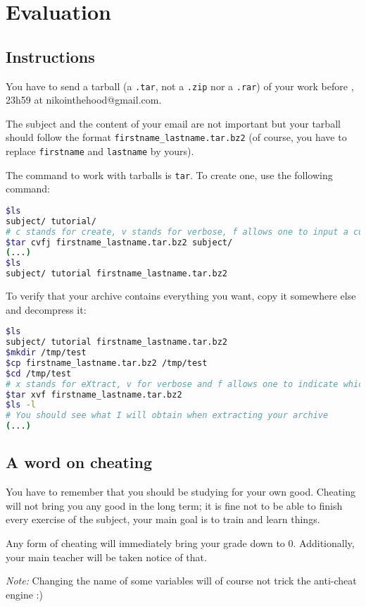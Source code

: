 \documentclass[12pt]{article}
\begin{document}
\section{Evaluation}
\subsection{Instructions}

You have to send a tarball (a \texttt{.tar}, not a \texttt{.zip} nor a \texttt{.rar}) of your work before , 23h59 at nikointhehood@gmail.com.

The subject and the content of your email are not important but your tarball should follow the format \texttt{firstname\_lastname.tar.bz2} (of course, you have to replace \texttt{firstname} and \texttt{lastname} by yours).

The command to work with tarballs is \texttt{tar}. To create one, use the following command:

\begin{lstlisting}[language=bash]
$ls
subject/ tutorial/
# c stands for create, v stands for verbose, f allows one to input a custom name for the archive and j indicates the usage of bzip2
$tar cvfj firstname_lastname.tar.bz2 subject/
(...)
$ls
subject/ tutorial firstname_lastname.tar.bz2
\end{lstlisting}

To verify that your archive contains everything you want, copy it somewhere else and decompress it:

\begin{lstlisting}[language=bash]
$ls
subject/ tutorial firstname_lastname.tar.bz2
$mkdir /tmp/test
$cp firstname_lastname.tar.bz2 /tmp/test
$cd /tmp/test
# x stands for eXtract, v for verbose and f allows one to indicate which file tar should work with
$tar xvf firstname_lastname.tar.bz2
$ls -l
# You should see what I will obtain when extracting your archive
(...)
\end{lstlisting}

\subsection{A word on cheating}

You have to remember that you should be studying for your own good. Cheating will not bring you any good in the long term; it is fine not to be able to finish every exercise of the subject, your main goal is to train and learn things.

Any form of cheating will immediately bring your grade down to 0. Additionally, your main teacher will be taken notice of that.

\textit{Note:} Changing the name of some variables will of course not trick the anti-cheat engine :)
\end{document}
